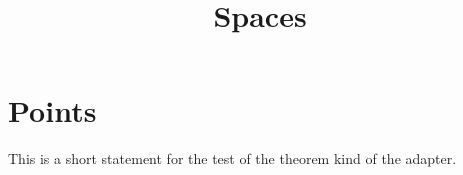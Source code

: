 

\title{Spaces}



\label{section-phantom}

\section{Points}
\label{section-points}

\begin{theorem}
\label{theorem-named}
This is a short statement for the test of the theorem kind of the adapter.
\end{theorem}


